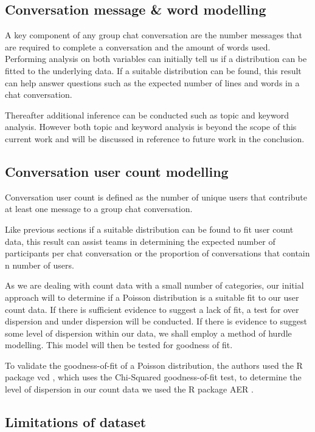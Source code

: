 \documentclass[conference]{IEEEtran}
\begin{document}
\subsection{Conversation message \& word modelling}

A key component of any group chat conversation are the number messages that are required to complete a conversation and the amount of words used. Performing analysis on both variables can initially tell us if a distribution can be fitted to the underlying data. If a suitable distribution can be found, this result can help answer questions such as the expected number of lines and words in a chat conversation.

Thereafter additional inference can be conducted such as topic and keyword analysis. However both topic and keyword analysis is beyond the scope of this current work and will be discussed in reference to future work in the conclusion.

\subsection{Conversation user count modelling}

Conversation user count is defined as the number of unique users that contribute at least one message to a group chat conversation. 

Like previous sections if a suitable distribution can be found to fit user count data, this result can assist teams in determining the expected number of participants per chat conversation or the proportion of conversations that contain n number of users.  

As we are dealing with count data with a small number of categories, our initial approach will to determine if a Poisson distribution is a suitable fit to our user count data. If there is sufficient evidence to suggest a lack of fit, a test for over dispersion and under dispersion will be conducted. If there is evidence to suggest some level of dispersion within our data, we shall employ a method of hurdle modelling. This model will then be tested for goodness of fit.

To validate the goodness-of-fit of a Poisson distribution, the authors used the R package vcd \cite{Rvcd}, which uses the Chi-Squared goodness-of-fit test, to determine the level of dispersion in our count data we used the R package AER \cite{RAER}.

\subsection{Limitations of dataset}
\end{document}
